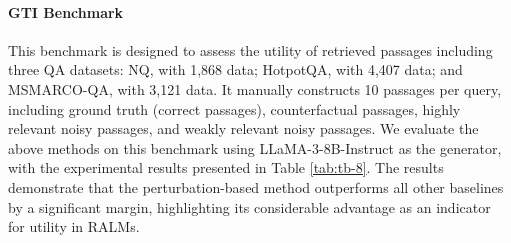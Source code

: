 \documentclass[11pt]{article}
\begin{document}
\paragraph{GTI Benchmark} This benchmark \citep[Ground-Truth Inclusion;][]{arellmgoodatutilityjudgements} is designed to assess the utility of retrieved passages including three QA datasets: NQ, with 1,868 data; HotpotQA, with 4,407 data; and MSMARCO-QA, with 3,121 data. It manually constructs 10 passages per query, including ground truth (correct passages), counterfactual passages, highly relevant noisy passages, and weakly relevant noisy passages. We evaluate the above methods on this benchmark using LLaMA-3-8B-Instruct as the generator, with the experimental results presented in Table \ref{tab:tb-8}. The results demonstrate that the perturbation-based method outperforms all other baselines by a significant margin, highlighting its considerable advantage as an indicator for utility in RALMs. 


\begin{table}
    \centering
    \caption{The experimental results comparing various utility attribution methods on the GTI benchmark. Attn., Grad., Pert., and G.T. represent Attention, Gradient, Perturbation and Ground Truth, respectively.}
    \label{tab:tb-8}
\end{table}
\end{document}
